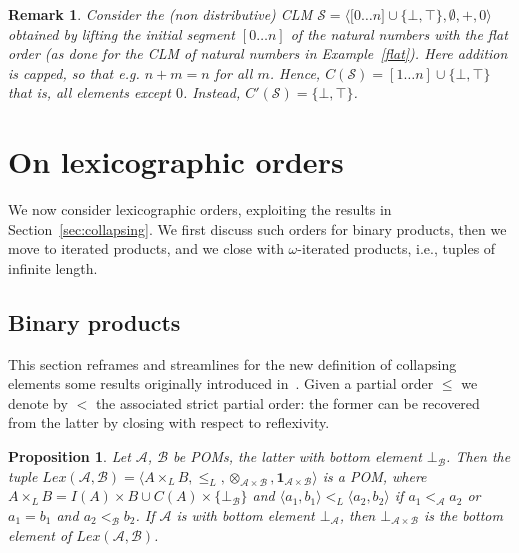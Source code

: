 \documentclass[a4paper]{elsarticle}
\newtheorem{remark}{Remark}
\newtheorem{proposition}{Proposition}
\newcommand{\monop}{\otimes}
\newcommand{\1}{\mathbf{1}}
\begin{document}
\begin{remark}
	Consider the (non distributive) CLM $\mathcal{S} = \langle \mathbb [0 \ldots n] \cup \{\bot,\top\}, \emptyset, +, 0 \rangle$ 
	obtained by lifting the initial segment $[0 \ldots n]$ of the natural numbers with the flat order (as done for
	the CLM of natural numbers in Example~\ref{flat}). Here addition is capped, so that 
	e.g. $n + m = n$ for all $m$. Hence, $C(\mathcal{S}) = [1 \ldots n] \cup \{\bot,\top\}$
	that is, all elements except $0$. Instead, $C'(\mathcal{S}) =  \{\bot,\top\}$.
\end{remark}

\section{On lexicographic orders}\label{sec:lexico}
We now consider lexicographic orders, exploiting the results in Section~\ref{sec:collapsing}.
%
We first discuss such orders for binary products, then we move to iterated products, 
and we close with $\omega$-iterated products, i.e., tuples of infinite length.

\subsection{Binary products}\label{sec:bynary}

This section reframes and streamlines for the new definition of collapsing elements some results originally
introduced in~\cite{GadducciHMW13}. Given a partial order $\leq$ we denote by $<$ the associated strict 
partial order: the former can be recovered from the latter by closing with respect to reflexivity.

\begin{proposition}\label{prop:lexBI}
	Let $\mathcal{A}$, $\mathcal{B}$ be POMs, the latter with bottom element $\bot_\mathcal{B}$.
	Then the tuple $Lex(\mathcal{A}, \mathcal{B}) = 
	\langle A \times_L B, \leq_L, \monop_{\mathcal{A} \times \mathcal{B}}, \1_{\mathcal{A} \times \mathcal{B}} \rangle$
	is a POM,
	where $A \times_L B = I(A) \times B \cup C(A) \times \{\bot_\mathcal{B}\}$ and
		$\langle a_1, b_1\rangle <_L \langle a_2, b_2\rangle$ if $a_1 <_\mathcal{A} a_2$ or $a_1 = b_1$ 
		and  $a_2 <_\mathcal{B} b_2$.
%
If $\mathcal{A}$ is with bottom element $\bot_\mathcal{A}$, then 
$\bot_{\mathcal{A} \times \mathcal{B}}$ is the bottom element of $Lex(\mathcal{A}, \mathcal{B})$.
\end{proposition}
\end{document}
